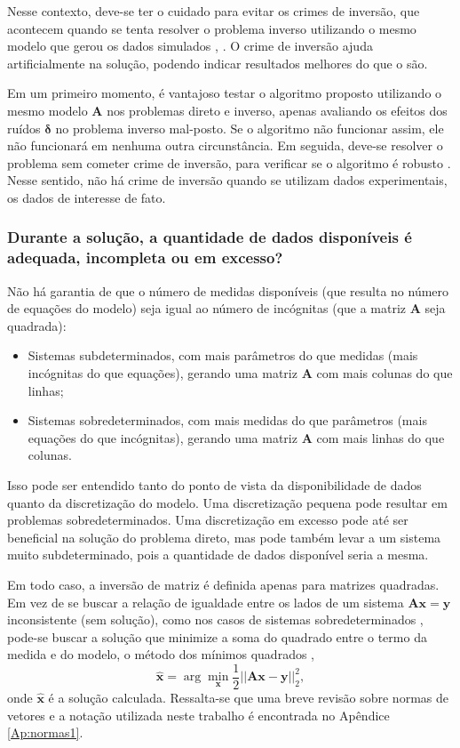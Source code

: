 Nesse contexto, deve-se ter o cuidado para evitar os crimes de inversão, que acontecem quando se tenta resolver o problema inverso utilizando o mesmo modelo que gerou os dados simulados \cite[pág. 139]{hansen2010discrete}, \cite[pág. 5]{kaipio2005statistical}. O crime de inversão ajuda artificialmente na solução, podendo indicar resultados melhores do que o são. 

Em um primeiro momento, é vantajoso testar o algoritmo proposto utilizando o mesmo modelo $\mathbf{A}$ nos problemas direto e inverso, apenas avaliando os efeitos dos ruídos $\bm{\delta}$ no problema inverso mal-posto. Se o algoritmo não funcionar assim, ele não funcionará em nenhuma outra circunstância. Em seguida, deve-se resolver o problema sem cometer crime de inversão, para verificar se o algoritmo é robusto \cite[pág. 163]{hansen2010discrete}. Nesse sentido, não há crime de inversão quando se utilizam dados experimentais, os dados de interesse de fato.


\subsubsection{Durante a solução, a quantidade de dados disponíveis é adequada, incompleta ou em excesso?}\label{sec:excess}
Não há garantia de que o número de medidas disponíveis (que resulta no número de equações do modelo) seja igual ao número de incógnitas (que a matriz $\mathbf{A}$ seja quadrada):
\begin{itemize}
\item Sistemas subdeterminados, com mais parâmetros do que medidas (mais incógnitas do que equações), gerando uma matriz $\mathbf{A}$ com mais colunas do que linhas;
\item Sistemas sobredeterminados, com mais medidas do que parâmetros (mais equações do que incógnitas), gerando uma matriz $\mathbf{A}$ com mais linhas do que colunas.
\end{itemize} 
Isso pode ser entendido tanto do ponto de vista da disponibilidade de dados quanto da discretização do modelo. Uma discretização pequena pode resultar em problemas sobredeterminados. Uma discretização em excesso pode até ser beneficial na solução do problema direto, mas pode também levar a um sistema muito subdeterminado, pois a quantidade de dados disponível seria a mesma. 

Em todo caso, a inversão de matriz é definida apenas para matrizes quadradas. Em vez de se buscar a relação de igualdade entre os lados de um sistema $\mathbf{A} \mathbf{x} = \mathbf{y}$ inconsistente (sem solução), como nos casos de sistemas sobredeterminados \cite[pág. 46]{goodfellow2016deep}, pode-se buscar  a solução que minimize a soma do quadrado entre o termo da medida e do modelo, o método dos mínimos quadrados \cite[pág. 260]{golub2013matrix}, 
\begin{equation}
\hat{\mathbf{x}} = \arg\min\limits_{\mathbf{x}}  \frac{1}{2} \vert \vert \mathbf{A}\mathbf{x} - \mathbf{y} \vert \vert^2_2 ,
\label{eq:otimizacao1}
\end{equation}
onde $\hat{\mathbf{x}}$ é a solução calculada. Ressalta-se que uma breve revisão sobre normas de vetores e a notação utilizada neste trabalho é encontrada no Apêndice \ref{Ap:normas1}.

